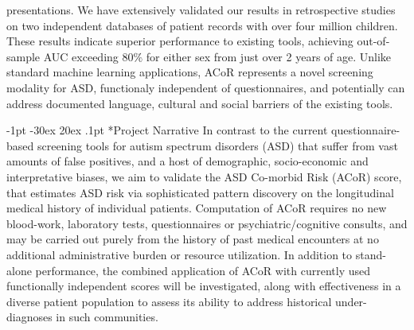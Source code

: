 \documentclass[onecolumn, compsoc,11pt]{IEEEtran}
\makeatletter
\renewcommand\section{\@startsection {section}{1}{\z@}%
                                   {-1pt \@plus -30ex \@minus 20ex}%
                                   {.1pt}%
                                   {\large\bfseries\scshape}}
\def\acor{ACoR\xspace}
\makeatother
\begin{document}
presentations. We have extensively validated our results in retrospective studies on two independent databases of patient records with over four million children. These results  indicate superior performance to existing tools, achieving out-of-sample AUC exceeding  $80\%$ for  either sex from just over 2 years of age. Unlike standard machine learning applications, \acor represents a novel screening modality for ASD, functionaly independent of questionnaires, and potentially can address documented language, cultural and social barriers of the existing tools.
\clearpage

\section*{Project Narrative}
In contrast to the current questionnaire-based screening tools for autism spectrum disorders (ASD) that suffer from vast amounts of false positives, and a host of demographic, socio-economic and interpretative biases, we aim to validate the ASD Co-morbid Risk (ACoR) score, that estimates ASD risk via sophisticated pattern discovery on the longitudinal medical history of individual patients. Computation of ACoR requires no new blood-work, laboratory tests, questionnaires or psychiatric/cognitive consults, and may be carried out purely from the history of past medical encounters at no additional administrative burden or resource utilization. In addition to stand-alone performance, the combined application of ACoR with currently used functionally independent scores
will be investigated, along with effectiveness in a diverse patient population to assess its ability to address historical under-diagnoses in such communities.

\end{document}

